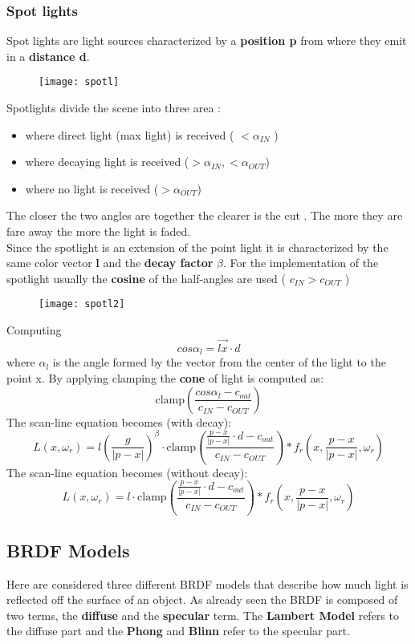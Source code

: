 \subsubsection{Spot lights}
Spot lights are light sources characterized by a \textbf{position p } from where they emit in a \textbf{distance d}.
\begin{figure}[H]
  \centering
  \texttt{[image: spotl]}
\end{figure}
Spotlights divide the scene into three area : 
\begin{itemize}
\item where direct light (max light) is received ( $< \alpha_{IN}$ )
\item where decaying light is received ($> \alpha_{IN} , < \alpha_{OUT}$)
\item where no light is received  ($>\alpha_{OUT}$)
\end{itemize}
The closer the two angles are together the clearer is the cut . The more they are fare away the more the light is faded.\\
Since the spotlight is an extension of the point light it is characterized by the same color vector \textbf{l} and the \textbf{decay factor} $\beta$. For the implementation of the spotlight usually the \textbf{cosine} of the half-angles are used ( $c_{IN} > c_{OUT}$ ) 
\begin{figure}[H]
  \centering
  \texttt{[image: spotl2]}
\end{figure}
Computing $$ cos \alpha_{l} = \vec{lx} \cdot d$$ where $\alpha_l$ is the angle formed by the vector from the center of the light to the point x.
By applying clamping the \textbf{cone } of light is computed as:
$$ \text{clamp} \left( \frac{cos\alpha_l - c_{out}}{c_{IN}-c_{OUT}} \right)$$
The scan-line equation becomes (with decay):
\[
\boxed{L(x,\omega_r)= l \left( \frac{g}{|p-x|} \right)^{\beta} \cdot \text{clamp} \left( \frac{\frac{p-x}{|p-x|} \cdot d  - c_{out}}{c_{IN}-c_{OUT}} \right) * f_r \left( x, \frac{p-x}{|p-x|},\omega_r \right) }
\]
The scan-line equation becomes (without decay):
\[
\boxed{L(x,\omega_r)= l \cdot \text{clamp} \left( \frac{\frac{p-x}{|p-x|} \cdot d - c_{out}}{c_{IN}-c_{OUT}} \right) * f_r \left( x, \frac{p-x}{|p-x|},\omega_r \right) }
\]


\subsection{BRDF Models}
Here are considered three different BRDF models that describe how much light is reflected off the surface of an object. As already seen the BRDF is composed of two terms, the \textbf{diffuse} and the \textbf{specular} term. The \textbf{Lambert Model} refers to the diffuse part and the \textbf{Phong} and \textbf{Blinn} refer to the specular part.

